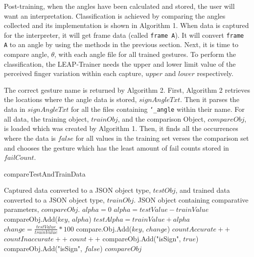 \documentclass[letterpaper, 10 pt, conference]{ieeeconf}
\begin{document}
Post-training, when the angles have been calculated and stored, the user will want an interpretation. Classification is achieved by comparing the angles collected and its implementation is shown in Algorithm 1. When data is captured for the interpreter, it will get frame data (called \texttt{frame A}). It will convert \texttt{frame A} to an angle by using the methods in the previous section. Next, it is time to compare angle, $\theta$, with each angle file for all trained gestures. To perform the classification, the LEAP-Trainer needs the upper and lower limit value of the perceived finger variation within each capture, $upper$ and $lower$ respectively. 

\vspace{5pt}
The correct gesture name is returned by Algorithm 2. First, Algorithm 2 retrieves the locations where the angle data is stored, $signAngleTxt$. Then it parses the data in $signAngleTxt$ for all the files containing \texttt{\char`_angle} within their name. For all data, the training object, $trainObj$, and the comparison Object, $compareObj$, is loaded which was created by Algorithm 1. Then, it finds all the occurrences where the data is $false$ for all values in the training set verses the comparison set and chooses the gesture which has the least amount of fail counts stored in $failCount$.

\begin{algorithm}[H] 
 \caption{compareTestAndTrainData}
 \begin{algorithmic}
 \renewcommand{\algorithmicrequire}{\textbf{Input:}}
 \renewcommand{\algorithmicensure}{\textbf{Output:}}
 \REQUIRE Captured data converted to a JSON object type, $testObj$, and trained data converted to a JSON object type, $trainObj$.
 \ENSURE JSON object containing comparative parameters, $compareObj$.
 \vspace{5pt}
  \STATE $alpha = 0$
  	\STATE $alpha = testValue - trainValue$
    \STATE compareObj.Add($key$, $alpha$)
    \ELSE 
    \STATE $testAlpha = trainValue + alpha$
    \vspace{2pt}
    \STATE $change = \frac{testValue}{trainValue} * 100$
    \vspace{2pt}
    \STATE compare.Obj.Add($key$, $change$)
         \STATE $countAccurate++$
         \ELSE 
         \STATE $countInaccurate++$
         \ENDIF
  	\ENDIF 
    \STATE $count++$
  \ENDFOR
  \STATE compareObj.Add("isSign", $true$)
  \ELSE 
  \STATE compareObj.Add("isSign", $false$)
  \ENDIF
 \RETURN $compareObj$ 
 \end{algorithmic} 
\end{algorithm}
\end{document}
